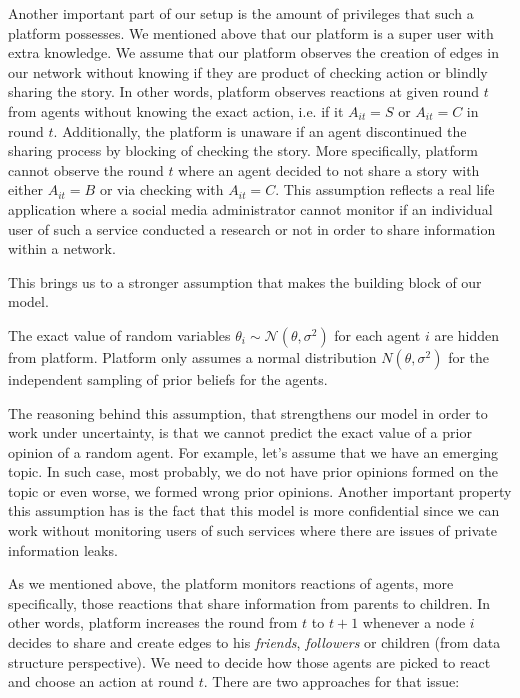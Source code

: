 Another important part of our setup is the amount of privileges that such a platform possesses. We mentioned above that our platform is a super user with extra knowledge. We assume that our platform observes the creation of edges in our network without knowing if they are product of checking action or blindly sharing the story. In other words, platform observes reactions at given round $t$ from agents without knowing the exact action, i.e. if it $A_{it}=S$ or $A_{it}=C$ in round $t$. Additionally, the platform is unaware if an agent discontinued the sharing process by blocking of checking the story. More specifically, platform cannot observe the round $t$ where an agent decided to not share a story with either $A_{it}=B$ or via checking with $A_{it}=C$. This assumption reflects a real life application where a social media administrator cannot monitor if an individual user of such a service conducted a research or not in order to share information within a network. 

This brings us to a stronger assumption that makes the building block of our model.

\begin{assumption}
	The exact value of random variables $\theta_i \sim \mathcal{N} (\theta,\sigma^2)$ for each agent $i$ are hidden from platform. Platform only assumes a normal distribution $N(\theta,\sigma^2)$ for the independent sampling of prior beliefs for the agents.
\end{assumption}
The reasoning behind this assumption, that strengthens our model in order to work under uncertainty, is that we cannot predict the exact value of a prior opinion of a random agent. For example, let's assume that we have an emerging topic. In such case, most probably, we do not have prior opinions formed on the topic or even worse, we formed wrong prior opinions. Another important property this assumption has is the fact that this model is more confidential since we can work without monitoring users of such services where there are issues of private information leaks.

As we mentioned above, the platform monitors reactions of agents, more specifically, those reactions that share information from parents to children. In other words, platform increases the round from $t$ to $t+1$ whenever a node $i$ decides to share and create edges to his \textit{friends}, \textit{followers} or children (from data structure perspective). We need to decide how those agents are picked to react and choose an action at round $t$. There are two approaches for that issue:

